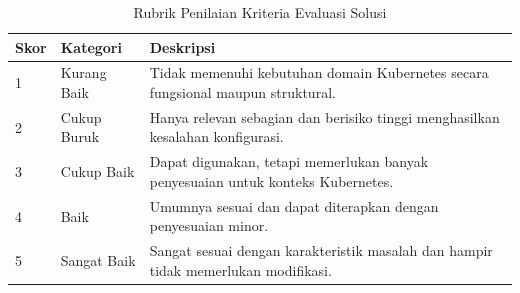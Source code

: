 \captionsetup[table]{justification=raggedright,singlelinecheck=false}

\begin{table}[htbp]
\centering
\caption{Rubrik Penilaian Kriteria Evaluasi Solusi}
\label{tbl:rubrik_eval}
\begin{tabular}{ |p{}|p{}|p{}| }
\hline
\textbf{Skor} & \textbf{Kategori} & \textbf{Deskripsi} \\
\hline
1 & Kurang Baik & Tidak memenuhi kebutuhan domain Kubernetes secara fungsional maupun struktural. \\ \hline
2 & Cukup Buruk & Hanya relevan sebagian dan berisiko tinggi menghasilkan kesalahan konfigurasi. \\ \hline
3 & Cukup Baik & Dapat digunakan, tetapi memerlukan banyak penyesuaian untuk konteks Kubernetes. \\ \hline
4 & Baik & Umumnya sesuai dan dapat diterapkan dengan penyesuaian minor. \\ \hline
5 & Sangat Baik & Sangat sesuai dengan karakteristik masalah dan hampir tidak memerlukan modifikasi. \\ \hline
\end{tabular}
\end{table}
